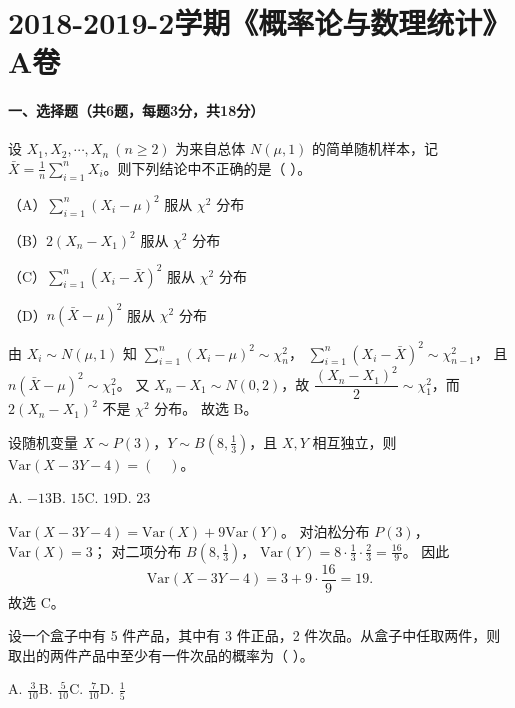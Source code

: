 \documentclass[lang=cn,11pt]{elegantbook}
\begin{document}
\section{2018-2019-2学期《概率论与数理统计》A卷}

\paragraph*{一、选择题（共6题，每题3分，共18分）}
\begin{exercise}
\par
设 \(X_1,X_2,\cdots,X_n\ (n\ge2)\) 为来自总体 \(N(\mu,1)\) 的简单随机样本，记 \(\bar{X}=\frac{1}{n}\sum_{i=1}^n X_i\)。则下列结论中不正确的是（ ）。

（A）\(\sum_{i=1}^n (X_i-\mu)^2\) 服从 \(\chi^2\) 分布

（B）\(2(X_n-X_1)^2\) 服从 \(\chi^2\) 分布

（C）\(\sum_{i=1}^n (X_i-\bar{X})^2\) 服从 \(\chi^2\) 分布

（D）\(n(\bar{X}-\mu)^2\) 服从 \(\chi^2\) 分布
\end{exercise}

\begin{solution}
\par
由 \(X_i\sim N(\mu,1)\) 知 \(\sum_{i=1}^n (X_i-\mu)^2\sim \chi^2_n\)，
\(\sum_{i=1}^n (X_i-\bar{X})^2\sim \chi^2_{n-1}\)，
且 \(n(\bar{X}-\mu)^2\sim \chi^2_1\)。
又 \(X_n-X_1\sim N(0,2)\)，故 \(\dfrac{(X_n-X_1)^2}{2}\sim \chi^2_1\)，而 \(2(X_n-X_1)^2\) 不是 \(\chi^2\) 分布。
故选 B。
\end{solution}
\begin{exercise}
\par
设随机变量 \(X\sim P(3)\)，\(Y\sim B\!\left(8,\frac13\right)\)，且 \(X,Y\) 相互独立，则 \(\mathrm{Var}(X-3Y-4)=(\quad)\)。

A. \(-13\)\qquad B. \(15\)\qquad C. \(19\)\qquad D. \(23\)
\end{exercise}

\begin{solution}
\par
\(\mathrm{Var}(X-3Y-4)=\mathrm{Var}(X)+9\mathrm{Var}(Y)\)。
对泊松分布 \(P(3)\)，\(\mathrm{Var}(X)=3\)；
对二项分布 \(B(8,\frac13)\)，
\(\mathrm{Var}(Y)=8\cdot\frac13\cdot\frac23=\frac{16}{9}\)。
因此
\[
  \mathrm{Var}(X-3Y-4)=3+9\cdot\frac{16}{9}=19.
\]
故选 C。
\end{solution}
\begin{exercise}
\par
设一个盒子中有 5 件产品，其中有 3 件正品，2 件次品。从盒子中任取两件，则取出的两件产品中至少有一件次品的概率为（ ）。

A. \(\frac{3}{10}\)\qquad B. \(\frac{5}{10}\)\qquad C. \(\frac{7}{10}\)\qquad D. \(\frac{1}{5}\)
\end{exercise}
\end{document}
